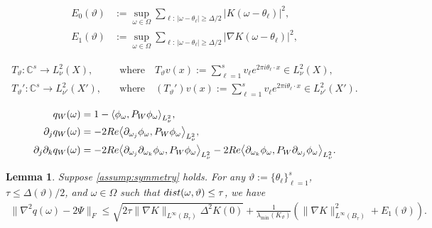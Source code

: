 \documentclass[10pt,a4paper]{amsart}
\newtheorem{lemma}{Lemma}
\def\C{\mathbb{C}}
\renewcommand{\Re}{{\rm Re}}
\def\dist{{\rm dist}}
\newcommand{\inner}[1]{{\left\langle#1\right\rangle}}
\def\wherespace{\quad\text{where}\quad}
\begin{document}
\begin{align}
E_0(\vartheta)
&:=
\sup_{\omega\in\Omega}
\sum_{\ell:\,|\omega-\theta_\ell|\ge \Delta/2}
|K(\omega-\theta_\ell)|^2,
\label{eq:E0def}
\\
E_1(\vartheta)
&:=
\sup_{\omega\in\Omega}
\sum_{\ell:\,|\omega-\theta_\ell|\ge \Delta/2}
|\nabla K(\omega-\theta_\ell)|^2,
\label{eq:E1def}
\end{align}

\begin{align}
	T_\vartheta\colon \C^s\to L^2_\nu(X), &\wherespace T_\vartheta v(x) := \sum_{\ell=1}^s v_\ell e^{2\pi i \theta_\ell\cdot x} \in L^2_\nu(X), \label{eq:synthesis1} \\
	T_\vartheta'\colon \C^s\to L^2_{\nu'}(X'), &\wherespace (T_\vartheta') v(x) := \sum_{\ell=1}^s v_\ell e^{2\pi i \theta_\ell\cdot x} \in L^2_{\nu'}(X'). \label{eq:synthesis2}
\end{align}

	\begin{align}
		q_W(\omega)
		&=1- \inner{\phi_\omega, P_W \phi_\omega}_{L^2_\nu}, \label{eq:q0} \\
		\partial_j q_W(\omega)
		&=-2\Re \inner{\partial_{\omega_j} \phi_\omega, P_{W} \phi_\omega}_{L^2_\nu}, \label{eq:q1} \\
		\partial_j \partial_k q_{W}(\omega)
		&=-2\Re \inner{\partial_{\omega_j} \partial_{\omega_k} \phi_\omega, P_{W} \phi_\omega}_{L^2_\nu} - 2 \Re \inner{\partial_{\omega_k} \phi_\omega, P_W \partial_{\omega_j}\phi_\omega}_{L^2_\nu}. \label{eq:q2}
	\end{align}

	\begin{lemma}
	\label{lem:approx2}
	Suppose \cref{assump:symmetry} holds. For any $\vartheta:=\{\theta_\ell\}_{\ell=1}^s$, $\tau\leq \Delta(\vartheta)/2$, and $\omega\in \Omega$ such that $\dist(\omega,\vartheta)\leq \tau$, we have
	\begin{align*}
		\|\nabla^2 q(\omega)-2 \Psi \|_F
		\leq \sqrt{2 \tau \|\nabla K\|_{L^\infty(B_\tau)} \Delta^2 K(0)} + \frac{1}{\lambda_{\min}(K_\vartheta)} \left(\|\nabla K\|_{L^\infty(B_\tau)}^2 + E_1(\vartheta) \right).
	\end{align*}
	\end{lemma}
\end{document}
